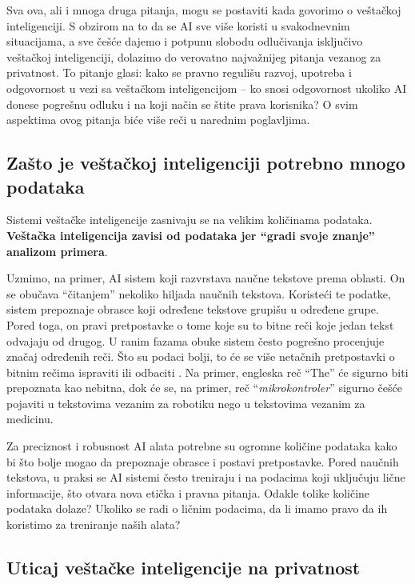 \documentclass[a4paper,12pt]{article}
\begin{document}
Sva ova, ali i mnoga druga pitanja, mogu se postaviti kada govorimo o veštačkoj inteligenciji. S obzirom na to da se AI sve više koristi  u svakodnevnim situacijama, a sve češće dajemo i potpunu slobodu odlučivanja isključivo veštačkoj inteligenciji, dolazimo do verovatno najvažnijeg pitanja vezanog za privatnost. To pitanje glasi: kako se pravno regulišu razvoj, upotreba i odgovornost u vezi sa veštačkom inteligencijom – ko snosi odgovornost ukoliko AI donese pogrešnu odluku i na koji način se štite prava korisnika? O svim aspektima ovog pitanja biće više reči u narednim poglavljima.


\subsection{Zašto je veštačkoj inteligenciji potrebno mnogo podataka}

Sistemi veštačke inteligencije zasnivaju se na velikim količinama podataka. \textbf{Veštačka inteligencija zavisi od podataka jer "`gradi svoje znanje"' analizom primera}\cite{whitevision_ai_privacy}.

Uzmimo, na primer, AI sistem koji razvrstava naučne tekstove prema oblasti. On se obučava "`čitanjem"' nekoliko hiljada naučnih tekstova. Koristeći te podatke, sistem prepoznaje obrasce koji određene tekstove grupišu u određene grupe. Pored toga, on pravi pretpostavke o tome koje su to bitne reči koje jedan tekst odvajaju od drugog. U ranim fazama obuke sistem često pogrešno procenjuje značaj određenih reči. Što su podaci bolji, to će se više netačnih pretpostavki o bitnim rečima ispraviti ili odbaciti \cite{whitevision_ai_privacy}. Na primer, engleska reč "`The"' će sigurno biti prepoznata kao nebitna, dok će se, na primer, reč "`\textit{mikrokontroler}"' sigurno češće pojaviti u tekstovima vezanim za robotiku nego u tekstovima vezanim za medicinu.

Za preciznost i robusnost AI alata potrebne su ogromne količine podataka kako bi što bolje mogao da prepoznaje obrasce i postavi pretpostavke. Pored naučnih tekstova, u praksi se AI sistemi često treniraju i na podacima koji uključuju lične informacije, što otvara nova etička i pravna pitanja. Odakle tolike količine podataka dolaze? Ukoliko se radi o ličnim podacima, da li imamo pravo da ih koristimo za treniranje naših alata?


\subsection{Uticaj veštačke inteligencije na privatnost}
\end{document}
